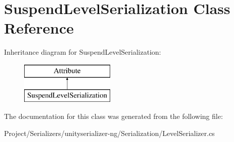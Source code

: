 \hypertarget{class_suspend_level_serialization}{}\section{Suspend\+Level\+Serialization Class Reference}
\label{class_suspend_level_serialization}
Inheritance diagram for Suspend\+Level\+Serialization\+:\begin{figure}[H]
\begin{center}
\leavevmode
\includegraphics[height=2.000000cm]{class_suspend_level_serialization}
\end{center}
\end{figure}


The documentation for this class was generated from the following file\+:\begin{DoxyCompactItemize}
\item 
Project/\+Serializers/unityserializer-\/ng/\+Serialization/Level\+Serializer.\+cs\end{DoxyCompactItemize}
